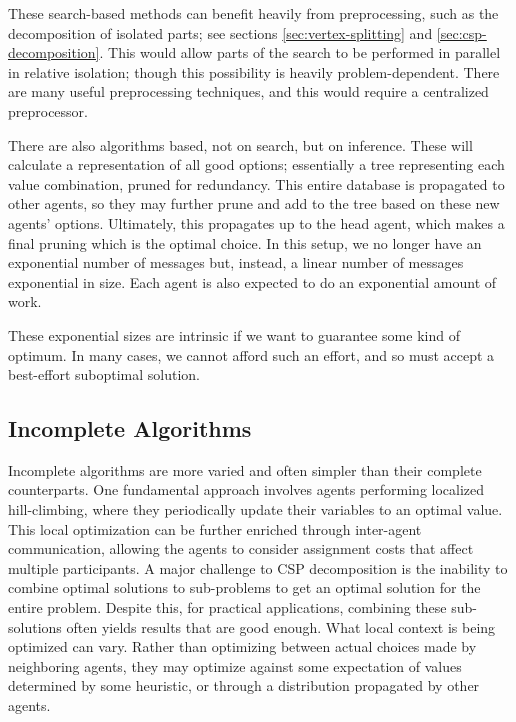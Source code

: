 These search-based methods can benefit heavily from preprocessing, such as the decomposition of isolated parts; see sections \ref{sec:vertex-splitting} and \ref{sec:csp-decomposition}. This would allow parts of the search to be performed in parallel in relative isolation; though this possibility is heavily problem-dependent. There are many useful preprocessing techniques, and this would require a centralized preprocessor.

There are also algorithms based, not on search, but on inference. These will calculate a representation of all good options; essentially a tree representing each value combination, pruned for redundancy. This entire database is propagated to other agents, so they may further prune and add to the tree based on these new agents' options. Ultimately, this propagates up to the head agent, which makes a final pruning which is the optimal choice. In this setup, we no longer have an exponential number of messages but, instead, a linear number of messages exponential in size. Each agent is also expected to do an exponential amount of work.

These exponential sizes are intrinsic if we want to guarantee some kind of optimum. In many cases, we cannot afford such an effort, and so must accept a best-effort suboptimal solution.

\subsection{Incomplete Algorithms}\label{sec:incomplete-algorithms}

Incomplete algorithms are more varied and often simpler than their complete counterparts. One fundamental approach involves agents performing localized hill-climbing, where they periodically update their variables to an optimal value. This local optimization can be further enriched through inter-agent communication, allowing the agents to consider assignment costs that affect multiple participants. A major challenge to CSP decomposition is the inability to combine optimal solutions to sub-problems to get an optimal solution for the entire problem. Despite this, for practical applications, combining these sub-solutions often yields results that are good enough. What local context is being optimized can vary. Rather than optimizing between actual choices made by neighboring agents, they may optimize against some expectation of values determined by some heuristic, or through a distribution propagated by other agents.


